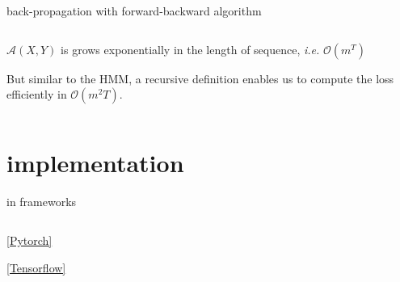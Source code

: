 \documentclass[aspectratio=169,xcolor={dvipsnames,svgnames}]{beamer}
\begin{document}
\begin{frame}[label={sec:org87e237b}]{back-propagation with forward-backward algorithm}
\begin{columns}
\begin{column}{.7\columnwidth}
\(\mathcal{A} (X,Y)\) is grows exponentially in the
length of sequence, \emph{i.e.} \(\mathcal{O}(m^T)\)

But similar to the HMM, a recursive definition enables
us to compute the loss efficiently in
\(\mathcal{O}(m^{2}T)\).
\end{column}
\end{columns}
\end{frame}

\section{implementation}
\label{sec:org91c67bf}
\begin{frame}[label={sec:org4390f2a}]{in frameworks}
\begin{columns}
\begin{column}{0.45\columnwidth}
\href{https://pytorch.org/docs/stable/generated/torch.nn.CTCLoss.html}{[Pytorch]​}

\href{https://www.tensorflow.org/api\_docs/python/tf/nn/ctc\_loss}{[Tensorflow]​}
\end{column}
\end{columns}
\end{frame}
\end{document}

